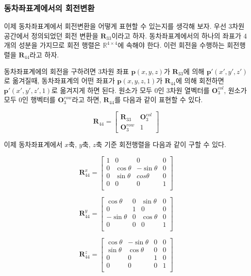 \subsubsection{동차좌표계에서의 회전변환}
이제 동차좌표계에서 회전변환을 어떻게 표현할 수 있는지를 생각해 보자. 우선 3차원 공간에서 정의되었던 회전 변환을 $\mathbf R_{33}$이라고 하자.
동차좌표계에서의 하나의 좌표가 4 개의 성분을 가지므로 회전 행렬은 $\mathbb R^{4 \times 4}$에 속해야 한다. 이런 회전을 수행하는 회전행렬을 
$\mathbf R_{44}$라고 하자.

동차좌표계에의 회전을 구하려면
3차원 좌표 $\mathbf p(x,y,z)$가 $\mathbf R_{33}$에 의해 $\mathbf{p'}(x',y',z')$로 옮겨질때,
동차좌표계의 어떤 좌표가 $\mathbf p(x,y,z,1)$가 $\mathbf R_{44}$에 의해 회전하면 $\mathbf{p'}(x',y',z',1)$로 옮겨지게 하면 된다.
원소가 모두 0인 3차원 열벡터를 $\mathbf O_3^{col}$, 원소가 모두 0인 행벡터를 $\mathbf O_3^{row}$라고 하면,
$\mathbf R_{44}$를 다음과 같이 표현할 수 있다.

$$\mathbf R_{44} = 
\left [
\begin{array}{cc}
\mathbf R_{33} & \mathbf O_3^{col} \\
\mathbf O_3^{row} & 1
\end{array}
\right ]
$$

이제 동차좌표계에서 $x$축, $y$축, $z$축 기준 회전행렬을 다음과 같이 구할 수 있다.

$$
\mathbf R_{44}^x =
\left [
\begin{array}{cccc}
 1 & 0 & 0 & 0 \\
 0 & \cos \theta & -\sin \theta &  0\\
 0  & \sin \theta & cos \theta & 0 \\
 0 & 0 & 0 & 1 \\
\end{array}
\right ]
$$

$$
\mathbf R_{44}^y =
\left [
\begin{array}{cccc}
 \cos \theta & 0 & \sin \theta & 0 \\
 0 & 1 & 0 & 0 \\
- \sin \theta & 0  & \cos \theta & 0 \\
 0 & 0 & 0 & 1\\
\end{array}
\right ]
$$

$$
\mathbf R_{44}^z =
\left [
\begin{array}{cccc}
 \cos \theta & - \sin \theta & 0 & 0 \\
 \sin \theta  & \cos \theta & 0 & 0 \\
 0 & 0 & 1 & 0 \\
 0 & 0 & 0 & 1\\
\end{array}
\right ]
$$

